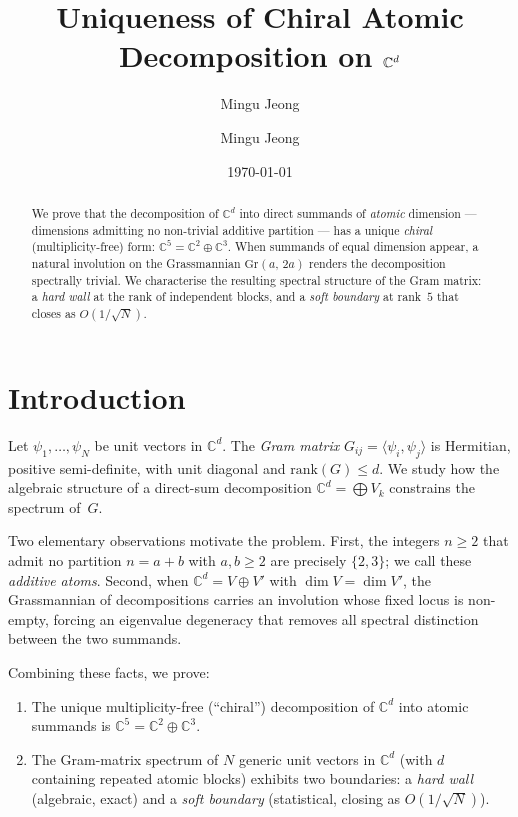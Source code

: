 \documentclass[12pt]{amsart}
\title{Uniqueness of Chiral Atomic Decomposition on $\CC^d$}
\author{Mingu Jeong}
\author{Mingu Jeong}
\date{\today}
\theoremstyle{definition}
\theoremstyle{remark}
\newcommand{\CC}{\mathbb{C}}
\newcommand{\Gr}{\mathrm{Gr}}
\begin{document}
\begin{abstract}
We prove that the decomposition of $\CC^d$ into
direct summands of \emph{atomic} dimension ---
dimensions admitting no non-trivial additive partition ---
has a unique \emph{chiral} (multiplicity-free) form:
$\CC^5 = \CC^2 \oplus \CC^3$.
When summands of equal dimension appear,
a natural involution on the Grassmannian
$\Gr(a,\,2a)$ renders the decomposition
spectrally trivial.
We characterise the resulting spectral structure
of the Gram matrix: a \emph{hard wall} at the
rank of independent blocks, and a \emph{soft boundary}
at rank~$5$ that closes as $O(1/\sqrt{N})$.
\end{abstract}

\maketitle
\tableofcontents

\section{Introduction}
\label{sec:intro}

Let $\psi_1, \ldots, \psi_N$ be unit vectors in $\CC^d$.
The \emph{Gram matrix}
$G_{ij} = \langle \psi_i, \psi_j \rangle$
is Hermitian, positive semi-definite, with unit diagonal
and $\mathrm{rank}(G) \le d$.
We study how the algebraic structure of a direct-sum
decomposition $\CC^d = \bigoplus V_k$ constrains the
spectrum of~$G$.

Two elementary observations motivate the problem.
First, the integers $n \ge 2$ that admit no partition
$n = a + b$ with $a, b \ge 2$ are precisely $\{2, 3\}$;
we call these \emph{additive atoms}.
Second, when $\CC^d = V \oplus V'$ with
$\dim V = \dim V'$, the Grassmannian of
decompositions carries an involution whose
fixed locus is non-empty,
forcing an eigenvalue degeneracy that removes
all spectral distinction between the two summands.

Combining these facts, we prove:

\begin{enumerate}[label=(\roman*)]
\item The unique multiplicity-free
  (``chiral'') decomposition of $\CC^d$
  into atomic summands is
  $\CC^5 = \CC^2 \oplus \CC^3$.
\item The Gram-matrix spectrum of $N$ generic
  unit vectors in $\CC^d$ (with $d$ containing
  repeated atomic blocks) exhibits two boundaries:
  a \emph{hard wall} (algebraic, exact)
  and a \emph{soft boundary}
  (statistical, closing as $O(1/\sqrt{N})$).
\end{enumerate}
\end{document}
